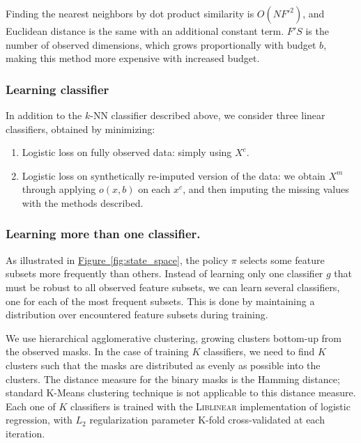 Finding the nearest neighbors by dot product similarity is $O(NF'^2)$, and Euclidean distance is the same with an additional constant term.
$F'S$ is the number of observed dimensions, which grows proportionally with budget $b$, making this method more expensive with increased budget.

\subsubsection{Learning classifier}


In addition to the $k$-NN classifier described above, we consider three linear classifiers, obtained by minimizing:
\begin{enumerate}
  \item Logistic loss on fully observed data: simply using $X^c$.
  \item Logistic loss on synthetically re-imputed version of the data: we obtain $X^m$ through applying $o(x, b)$ on each $x^c$, and then imputing the missing values with the methods described.
\end{enumerate}

\subsubsection{Learning more than one classifier.}

As illustrated in \hyperref[fig:state_space]{Figure~\ref*{fig:state_space}}, the policy $\pi$ selects some feature subsets more frequently than others.
Instead of learning only one classifier $g$ that must be robust to all observed feature subsets, we can learn several classifiers, one for each of the most frequent subsets.
This is done by maintaining a distribution over encountered feature subsets during training.

We use hierarchical agglomerative clustering, growing clusters bottom-up from the observed masks.
In the case of training $K$ classifiers, we need to find $K$ clusters such that the masks are distributed as evenly as possible into the clusters.
The distance measure for the binary masks is the Hamming distance; standard K-Means clustering technique is not applicable to this distance measure.
Each one of $K$ classifiers is trained with the \textsc{Liblinear} implementation of logistic regression, with $L_2$ regularization parameter K-fold cross-validated at each iteration.

